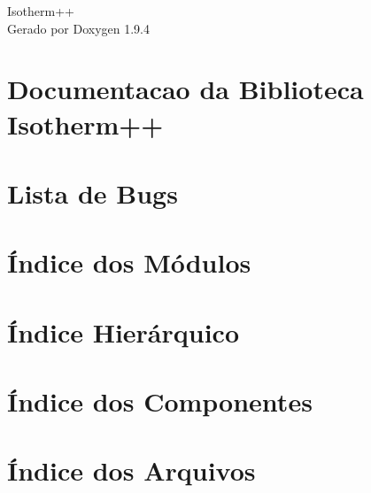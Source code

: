 \documentclass[twoside]{book}
\newcommand{\+}{\discretionary{\mbox{\scriptsize$\hookleftarrow$}}{}{}}
\newcommand{\clearemptydoublepage}{%
    \newpage{\pagestyle{empty}\cleardoublepage}%
  }
\begin{document}
  \raggedbottom
    \hypersetup{pageanchor=false,
                bookmarksnumbered=true,
                pdfencoding=unicode
               }
  \begin{titlepage}
  \vspace*{7cm}
  \begin{center}%
  {\Large Isotherm++}\\
  \vspace*{1cm}
  {\large Gerado por Doxygen 1.9.4}\\
  \end{center}
  \end{titlepage}
  \clearemptydoublepage
  \tableofcontents
  \clearemptydoublepage
  \hypersetup{pageanchor=true}
\chapter{Documentacao da Biblioteca Isotherm++}
\label{index}\hypertarget{index}{}
\chapter{Lista de Bugs}
\label{bug}

\chapter{Índice dos Módulos}

\chapter{Índice Hierárquico}

\chapter{Índice dos Componentes}

\chapter{Índice dos Arquivos}

\end{document}
